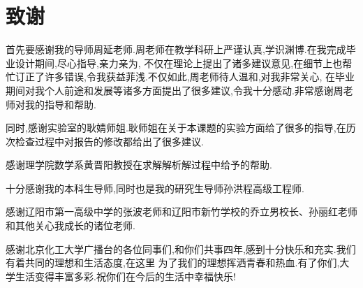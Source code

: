 \chapter{致谢}
首先要感谢我的导师周延老师.周老师在教学科研上严谨认真,学识渊博.在我完成毕业设计期间,尽心指导,亲力亲为,
不仅在理论上提出了诸多建议意见,在细节上也帮忙订正了许多错误,令我获益菲浅.不仅如此,周老师待人温和,对我非常关心,
在毕业期间对我个人前途和发展等诸多方面提出了很多建议,令我十分感动.非常感谢周老师对我的指导和帮助.\par
同时,感谢实验室的耿婧师姐.耿师姐在关于本课题的实验方面给了很多的指导,在历次检查过程中对报告的修改都给出了很多建议.\par
感谢理学院数学系黄晋阳教授在求解解析解过程中给予的帮助.\par
十分感谢我的本科生导师,同时也是我的研究生导师孙洪程高级工程师.\par
感谢辽阳市第一高级中学的张波老师和辽阳市新竹学校的乔立男校长、孙丽红老师和其他关心我成长的诸位老师.\par
感谢北京化工大学广播台的各位同事们,和你们共事四年,感到十分快乐和充实.我们有着共同的理想和生活态度,在这里
为了我们的理想挥洒青春和热血.有了你们,大学生活变得丰富多彩.祝你们在今后的生活中幸福快乐!\par
